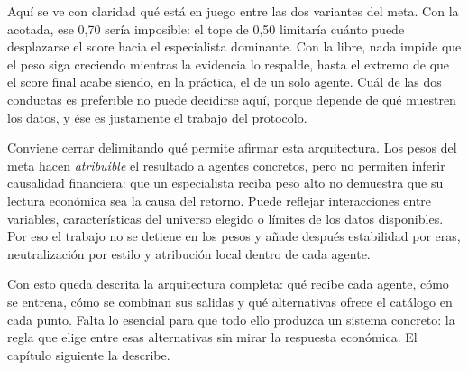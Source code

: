 Aquí se ve con claridad qué está en juego entre las dos variantes del meta. Con la acotada, ese 0,70
sería imposible: el tope de 0,50 limitaría cuánto puede desplazarse el score hacia el especialista
dominante. Con la libre, nada impide que el peso siga creciendo mientras la evidencia lo respalde,
hasta el extremo de que el score final acabe siendo, en la práctica, el de un solo agente. Cuál de
las dos conductas es preferible no puede decidirse aquí, porque depende de qué muestren los datos, y
ése es justamente el trabajo del protocolo.

Conviene cerrar delimitando qué permite afirmar esta arquitectura. Los pesos del meta hacen
\emph{atribuible} el resultado a agentes concretos, pero no permiten inferir causalidad financiera:
que un especialista reciba peso alto no demuestra que su lectura económica sea la causa del retorno.
Puede reflejar interacciones entre variables, características del universo elegido o límites de los
datos disponibles. Por eso el trabajo no se detiene en los pesos y añade después estabilidad por
eras, neutralización por estilo y atribución local dentro de cada agente.

Con esto queda descrita la arquitectura completa: qué recibe cada agente, cómo se entrena, cómo se
combinan sus salidas y qué alternativas ofrece el catálogo en cada punto. Falta lo esencial para que
todo ello produzca un sistema concreto: la regla que elige entre esas alternativas sin mirar la
respuesta económica. El capítulo siguiente la describe.
